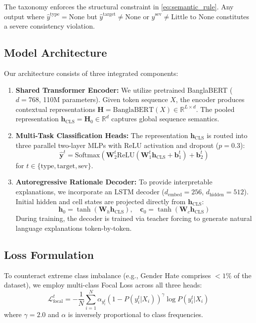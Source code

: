 \documentclass[conference]{IEEEtran}
\begin{document}
The taxonomy enforces the structural constraint in \eqref{eq:semantic_rule}. Any output where $\hat{y}^{\text{type}} = \text{None}$ but $\hat{y}^{\text{target}} \neq \text{None}$ or $\hat{y}^{\text{sev}} \neq \text{Little to None}$ constitutes a severe consistency violation.

\subsection{Model Architecture}
Our architecture consists of three integrated components:
\begin{enumerate}
    \item \textbf{Shared Transformer Encoder:} We utilize pretrained BanglaBERT \cite{bhattacharjee2022banglabert} ($d = 768$, 110M parameters). Given token sequence $X$, the encoder produces contextual representations $\mathbf{H} = \text{BanglaBERT}(X) \in \mathbb{R}^{L \times d}$. The pooled representation $\mathbf{h}_{\text{CLS}} = \mathbf{H}_0 \in \mathbb{R}^d$ captures global sequence semantics.
    
    \item \textbf{Multi-Task Classification Heads:} The representation $\mathbf{h}_{\text{CLS}}$ is routed into three parallel two-layer MLPs with ReLU activation and dropout ($p = 0.3$):
    \begin{equation}
    \hat{\mathbf{y}}^t = \text{Softmax}\left(\mathbf{W}_2^t \text{ReLU}(\mathbf{W}_1^t \mathbf{h}_{\text{CLS}} + \mathbf{b}_1^t) + \mathbf{b}_2^t\right)
    \end{equation}
    for $t \in \{\text{type}, \text{target}, \text{sev}\}$.
    
    \item \textbf{Autoregressive Rationale Decoder:} To provide interpretable explanations, we incorporate an LSTM decoder ($d_{\text{embed}} = 256$, $d_{\text{hidden}} = 512$). Initial hidden and cell states are projected directly from $\mathbf{h}_{\text{CLS}}$:
    \begin{equation}
    \mathbf{h}_0 = \tanh(\mathbf{W}_h \mathbf{h}_{\text{CLS}}), \quad \mathbf{c}_0 = \tanh(\mathbf{W}_c \mathbf{h}_{\text{CLS}})
    \end{equation}
    During training, the decoder is trained via teacher forcing to generate natural language explanations token-by-token.
\end{enumerate}

\subsection{Loss Formulation}
To counteract extreme class imbalance (e.g., Gender Hate comprises $<1\%$ of the dataset), we employ multi-class Focal Loss \cite{lin2017focal} across all three heads:
\begin{equation}
\mathcal{L}_{\text{focal}}^t = -\frac{1}{N} \sum_{i=1}^N \alpha_{y_i^t} (1 - P(y_i^t | X_i))^\gamma \log P(y_i^t | X_i)
\end{equation}
where $\gamma = 2.0$ and $\alpha$ is inversely proportional to class frequencies.
\end{document}
